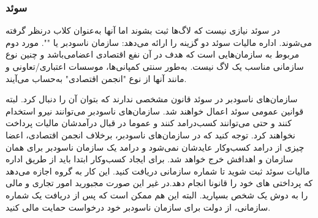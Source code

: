 \subsubsection{سوئد}
در سوئد نیازی نیست که لاگ‌ها ثبت بشوند اما آنها به‌عنوان کلاب
درنظر گرفته می‌شوند. اداره مالیات سوئد دو گزینه را ارائه می‌دهد:
سازمان ناسودبر یا
"".
مورد دوم مربوط به سازمان‌هایی
است که هدف در آن نفع اقتصادی اعضامی‌باشد و چنین نوع سازمانی مناسب
یک لاگ نیست. به‌طور سنتی کمپانی‌ها، موسسات اعتباری/تعاونی و مانند آنها
از نوع "انجمن اقتصادی" به‌حساب می‌آیند.

سازمان‌های ناسودبر در سوئد قانون مشخصی ندارند که بتوان آن را دنبال کرد.
لبته قوانین عمومی سوئد اعمال خواهند شد. سازمان‌های ناسودبر می‌توانند نیرو
استخدام کنند و حتی می‌توانند کسب‌درامد کنند و عموما در قبال درآمدشان مالیات
پرداخت نخواهند کرد. توجه کنید که در سازمان‌های ناسودبر، برخلاف انجمن اقتصادی،
اعضا چیزی از درامد کسب‌وکار عایدشان نمی‌شود و درامد یک سازمان ناسودبر برای همان
سازمان و اهدافش خرج خواهد شد.
برای ایجاد کسب‌وکار ابتدا باید از طریق اداره مالیات سوئد ثبت شوید تا
شماره سازمانی دریافت کنید. این کار به گروه اجازه می‌دهد که پرداختی های خود را
قانونا انجام دهد.در غیر این صورت مجبورید امور تجاری و مالی را به دوش یک شخص
بسپارید.
البته این هم ممکن است که پس از دریافت یک شماره سازمانی، از دولت برای سازمان
ناسودبر خود درخواست حمایت مالی کنید.

